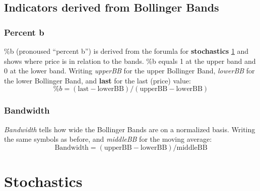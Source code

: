 \documentclass[letterpaper, 11pt]{article}
\newcommand{\1}{\mathds{1}}		%
\theoremstyle{definition}
\begin{document}
    \subsection{Indicators derived from Bollinger Bands}
    \subsubsection{Percent b}
    \%b (pronoused ``percent b'') is derived from the forumla for \textbf{stochastics} \ref{sec:stochastics} and shows where price is in relation to the bands. \%b equals 1 at the upper band and 0 at the lower band. Writing \textit{upperBB} for the upper Bollinger Band, \textit{lowerBB} for the lower Bollinger Band, and \textbf{last} for the last (price) value:
    $$ \%b = (\text{last} - \text{lowerBB}) / (\text{upperBB} - \text{lowerBB})$$
    \subsubsection{Bandwidth}
    \textit{Bandwidth} tells how wide the Bollinger Bands are on a normalized basis. Writing the same symbols as before, and \textit{middleBB} for the moving average:
    $$ \text{Bandwidth} = (\text{upperBB} - \text{lowerBB}) / \text{middleBB}$$
    \section{Stochastics}\label{sec:stochastics}
\end{document}
